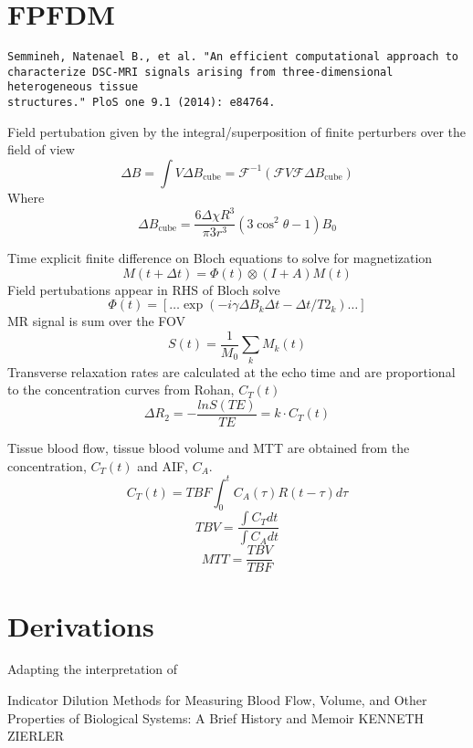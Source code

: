 \documentclass[12pt]{article}
\begin{document}
\section{FPFDM}

\begin{verbatim}
Semmineh, Natenael B., et al. "An efficient computational approach to
characterize DSC-MRI signals arising from three-dimensional heterogeneous tissue
structures." PloS one 9.1 (2014): e84764.
\end{verbatim}

Field pertubation given by the integral/superposition of finite perturbers over
the field of view
\[
\Delta B =  \int V \Delta B_\text{cube}  = \mathcal{F}^{-1} \left( \mathcal{F} V \mathcal{F} \Delta B_\text{cube} \right)
\]
Where
\[
\Delta B_\text{cube}  = \frac{ 6 \Delta \chi R^3} {\pi 3 r^3} (3 \cos^2 \theta-1) B_0
\]

Time explicit finite difference on Bloch equations to solve for magnetization
\[
M(t+\Delta t) = \Phi(t) \otimes (I+A)M(t)
\]
Field pertubations appear in RHS of Bloch solve
\[
\Phi(t) = [ \dots \exp(-i \gamma \Delta B_k \Delta t - \Delta t / T2_k) \dots ] 
\]
MR signal is sum over the FOV
\[
S(t) = \frac{1}{M_0} \sum_k M_k(t)
\]
Transverse relaxation rates are calculated at the echo time and are proportional
to the concentration curves from Rohan, $C_T(t)$
\[
\Delta R_2 = - \frac{ ln S(TE)}{TE} = k \cdot C_T(t)
\]

Tissue blood flow, tissue blood volume and MTT are obtained from the
concentration, $C_T(t)$ and AIF, $C_A$.
\[
C_T(t) = TBF \int_0^t C_A(\tau) R (t-\tau) d\tau
\]
\[
TBV = \frac{ \int C_T dt}{\int C_A dt}
\]
\[
MTT = \frac{TBV}{TBF}
\]


\section{Derivations}
Adapting  the interpretation of 

Indicator Dilution Methods for Measuring Blood Flow, Volume,
and Other Properties of Biological Systems:
A Brief History and Memoir
KENNETH ZIERLER
\end{document}
